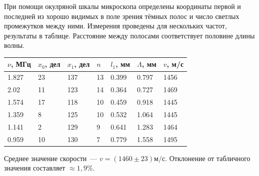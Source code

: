При помощи окулряной шкалы микроскопа определены координаты первой и последней из хорошо видимых в поле зрения тёмных полос и число светлых промежутков между ними. Измерения проведены для нескольких частот, результаты в таблице. Расстояние между полосами соответствует половине длины волны.

\begin{table}[!ht]
\centering
\begin{tabular}{|l|l|l|l|l|l|l|}
\hline
$\nu$, МГц & $x_0$, дел & $x_1$, дел & $n$ & $l_1$, мм & $\Lambda$, мм & $v$, м/с \\ \hline
1.827 & 23 & 137 & 13 & 0.399 & 0.797 & 1456 \\ \hline
2.02 & 11 & 123 & 14 & 0.364 & 0.727 & 1469 \\ \hline
1.574 & 17 & 118 & 10 & 0.459 & 0.918 & 1445 \\ \hline
1.359 & 8 & 125 & 10 & 0.532 & 1.064 & 1445 \\ \hline
1.141 & 2 & 129 & 9 & 0.641 & 1.283 & 1464 \\ \hline
0.959 & 10 & 130 & 7 & 0.779 & 1.558 & 1495 \\ \hline
\end{tabular}
\end{table}

Среднее значение скорости~--- $v = (1460 \pm 23)\text{м/с}$. Отклонение от табличного значения составляет $\approx 1,9\%$.








